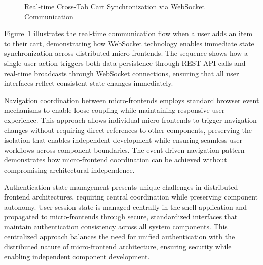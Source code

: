 \documentclass[12pt,a4paper]{report}
\begin{document}
\begin{figure}[htbp]
{
}
\caption{Real-time Cross-Tab Cart Synchronization via WebSocket Communication}
\label{fig:websocket-communication}
\end{figure}

Figure~\ref{fig:websocket-communication} illustrates the real-time communication flow when a user adds an item to their cart, demonstrating how WebSocket technology enables immediate state synchronization across distributed micro-frontends. The sequence shows how a single user action triggers both data persistence through REST API calls and real-time broadcasts through WebSocket connections, ensuring that all user interfaces reflect consistent state changes immediately.

Navigation coordination between micro-frontends employs standard browser event mechanisms to enable loose coupling while maintaining responsive user experience. This approach allows individual micro-frontends to trigger navigation changes without requiring direct references to other components, preserving the isolation that enables independent development while ensuring seamless user workflows across component boundaries. The event-driven navigation pattern demonstrates how micro-frontend coordination can be achieved without compromising architectural independence.

Authentication state management presents unique challenges in distributed frontend architectures, requiring central coordination while preserving component autonomy. User session state is managed centrally in the shell application and propagated to micro-frontends through secure, standardized interfaces that maintain authentication consistency across all system components. This centralized approach balances the need for unified authentication with the distributed nature of micro-frontend architecture, ensuring security while enabling independent component development.
\end{document}
